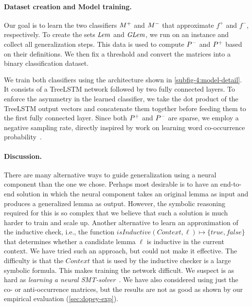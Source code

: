 

\paragraph{Dataset creation and Model training.} Our goal is to learn the two classifiers $M^+$ and $M^-$ that approximate $f^{+}$ and $f^{-}$, respectively. To create the sets $\mathit{Lem}$ and $\mathit{GLem}$, we run \spc on an instance and collect all generalization steps. This data is used to compute $P^-$ and $P^+$ based on their definitions.
We then fix a threshold and convert the matrices into a binary classification dataset.

We train both classifiers using the architecture shown in \cref{subfig-4:model-detail}. It consists of a TreeLSTM network followed by two fully connected layers. To enforce the asymmetry in the learned classifier, we take the dot product of the TreeLSTM output vectors and concatenate them together before feeding them to the first fully connected layer. Since both $P^+$ and $P^-$ are sparse, we employ a negative sampling rate, directly inspired by work on learning word co-occurrence probability~\cite{glove}.

\paragraph{Discussion.} There are many alternative ways to guide generalization using a neural component than the one we chose. Perhaps most desirable is to have an end-to-end solution in which the neural component takes an original lemma as input and produces a generalized lemma as output. However,  the symbolic reasoning required for this is so complex that we believe that such a solution is much harder to train and scale up. Another alternative to learn an approximation of the inductive check, i.e., the function $\mathit{isInductive}(\mathit{Context}, \ell) \mapsto \{true, false\}$ that determines whether a candidate lemma $\ell$ is inductive in the current context. We have tried such an approach, but could not make it effective. The difficulty is that the $\mathit{Context}$ that is used by the inductive checker is a large symbolic formula. This makes training the network difficult. We suspect is as hard as \emph{learning a neural SMT-solver}~\cite{DBLP:conf/iclr/SelsamLBLMD19,DBLP:conf/sat/SelsamB19}. We have also considered using just the co- or anti-occurrence matrices, but the results are not as good as shown by our empirical evaluation (\cref{sec:dopey-exp}). 

